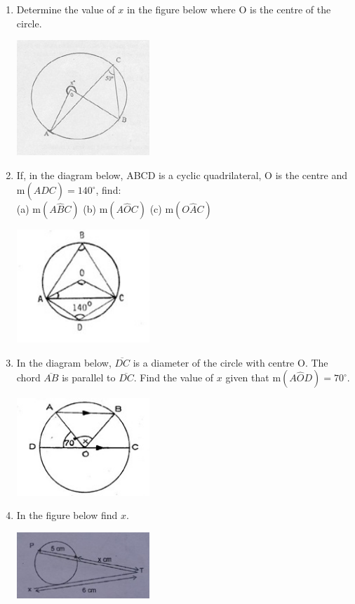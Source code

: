 \begin{enumerate}
	\item Determine the value of $x$ in the figure below where O is the centre of the circle.
	\begin{center}
	\includegraphics[width=5cm]{./img/circ7.jpg}
	\end{center}

	\item If, in the diagram below, ABCD is a cyclic quadrilateral, O is the centre and m$(A\hat{D}C) = 140^\circ$, find:\\
	(a) m$(A\hat{B}C)$ \quad (b) m$(A\hat{O}C)$ \quad (c) m$(O\hat{A}C)$
	\begin{center}
	\includegraphics[width=5cm]{./img/circ8.jpg}
	\end{center}

	\item In the diagram below, $\overline{DC}$ is a diameter of the circle with centre O. The chord $\overline{AB}$ is parallel to $\overline{DC}$. Find the value of $x$ given that m$(A\hat{O}D) = 70^\circ$.
	\begin{center}
	\includegraphics[width=5cm]{./img/circ9.jpg}
	\end{center}

	\item In the figure below find $x$.
	\begin{center}
	\includegraphics[width=5cm]{./img/circ10.jpg}
	\end{center}


\end{enumerate}
